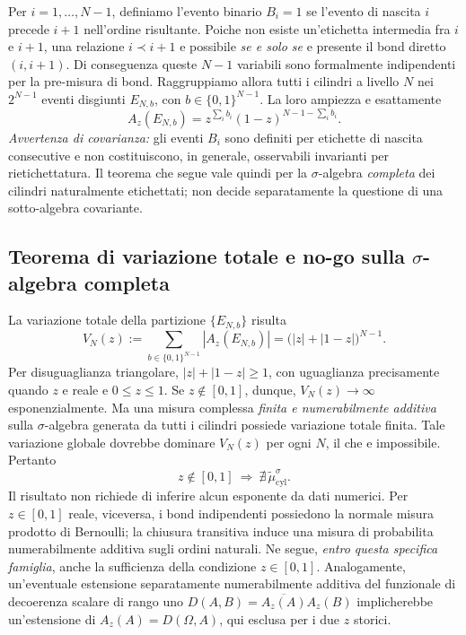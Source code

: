\documentclass[11pt,a4paper]{article}
\begin{document}
Per $i=1,\dots,N-1$, definiamo l'evento binario $B_i=1$ se l'evento di nascita $i$ precede $i+1$ nell'ordine risultante. Poiche non esiste un'etichetta intermedia fra $i$ e $i+1$, una relazione $i\prec i+1$ e possibile \emph{se e solo se} e presente il bond diretto $(i,i+1)$. Di conseguenza queste $N-1$ variabili sono formalmente indipendenti per la pre-misura di bond. Raggruppiamo allora tutti i cilindri a livello $N$ nei $2^{N-1}$ eventi disgiunti $E_{N,b}$, con $b\in\{0,1\}^{N-1}$. La loro ampiezza e esattamente
\begin{equation}
 A_z(E_{N,b})=z^{\sum_i b_i}(1-z)^{N-1-\sum_i b_i}.
 \label{eq:r12ap_partition}
\end{equation}
\emph{Avvertenza di covarianza:} gli eventi $B_i$ sono definiti per etichette di nascita consecutive e non costituiscono, in generale, osservabili invarianti per rietichettatura. Il teorema che segue vale quindi per la $\sigma$-algebra \emph{completa} dei cilindri naturalmente etichettati; non decide separatamente la questione di una sotto-algebra covariante.

\subsection{Teorema di variazione totale e no-go sulla $\sigma$-algebra completa}

La variazione totale della partizione $\{E_{N,b}\}$ risulta
\begin{equation}
 \boxed{V_N(z):=\sum_{b\in\{0,1\}^{N-1}}|A_z(E_{N,b})|
 =\bigl(|z|+|1-z|\bigr)^{N-1}.}
 \label{eq:r12ap_variation}
\end{equation}
Per disuguaglianza triangolare, $|z|+|1-z|\ge1$, con uguaglianza precisamente quando $z$ e reale e $0\le z\le1$. Se $z\notin[0,1]$, dunque, $V_N(z)\to\infty$ esponenzialmente. Ma una misura complessa \emph{finita e numerabilmente additiva} sulla $\sigma$-algebra generata da tutti i cilindri possiede variazione totale finita. Tale variazione globale dovrebbe dominare $V_N(z)$ per ogni $N$, il che e impossibile. Pertanto
\begin{equation}
 \boxed{z\notin[0,1]\ \Longrightarrow\ \nexists\,\widetilde\mu_{\mathrm{cyl}}^{\sigma}.}
 \label{eq:r12ap_nogo}
\end{equation}
Il risultato non richiede di inferire alcun esponente da dati numerici. Per $z\in[0,1]$ reale, viceversa, i bond indipendenti possiedono la normale misura prodotto di Bernoulli; la chiusura transitiva induce una misura di probabilita numerabilmente additiva sugli ordini naturali. Ne segue, \emph{entro questa specifica famiglia}, anche la sufficienza della condizione $z\in[0,1]$. Analogamente, un'eventuale estensione separatamente numerabilmente additiva del funzionale di decoerenza scalare di rango uno $D(A,B)=\overline{A_z(A)}A_z(B)$ implicherebbe un'estensione di $A_z(A)=D(\Omega,A)$, qui esclusa per i due $z$ storici.
\end{document}
